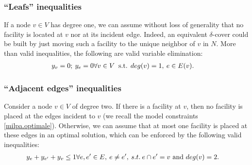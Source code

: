 \subsubsection*{``Leafs'' inequalities}
If a node $v\in V$ has degree one, we can assume without loss of generality that no facility is located at $v$ nor at its incident edge. Indeed, an equivalent $\delta$-cover could be built by just moving such a facility to the unique neighbor of $v$ in $N$. More than valid inequalities, the following are valid variable elimination:
\begin{eqnarray}
y_v=0;\: y_e=0 & \forall  v \in V \: \textup{ s.t. } deg(v)=1, \: e\in E(v).\label{const-valid2}
\end{eqnarray}

\subsubsection*{``Adjacent edges'' inequalities}
Consider a node $v\in V$ of degree two. If there is a facility at $v$, then no facility is placed at the edges incident to $v$ (we recall the model constraints \eqref{milpa.optimale}). Otherwise, we can assume that at most one facility is placed at these edges in an optimal solution, which can be enforced by the following valid inequalities:
\begin{eqnarray}
y_e+y_{e'}+y_{v}\leq 1 & \forall  e,e'\in E, \: e\neq e',\: s.t. \: e\cap e'=v \textup{ and } deg(v)=2.\label{valid-deg2}
\end{eqnarray}
